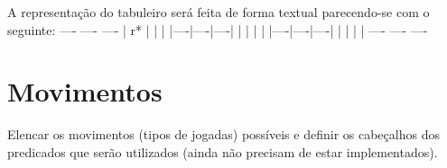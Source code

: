 \documentclass[a4paper]{article}
\begin{document}
A representação do tabuleiro será feita de forma textual parecendo-se com o seguinte: \linebreak ---- ---- ---- \linebreak
| r* |    |    | \linebreak
|----|----|----| \linebreak
|    |    |    | \linebreak
|----|----|----| \linebreak
|    |    |    | \linebreak
 ---- ---- ----  \linebreak
\linebreak


\section{Movimentos}

Elencar os movimentos (tipos de jogadas) possíveis e definir os cabeçalhos dos predicados que serão utilizados (ainda não precisam de estar implementados).
\end{document}
